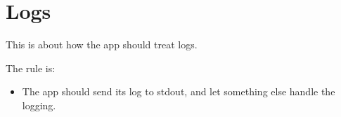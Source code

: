\section*{Logs}
This is about how the app should treat logs.

The rule is:
\begin{itemize}
\item The app should send its log to stdout, and let something else handle the logging.
\end{itemize}